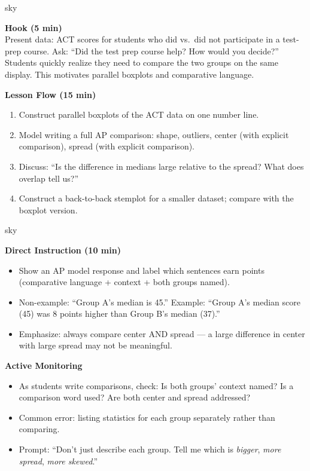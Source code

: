 \documentclass[10pt]{article}
\begin{document}
\begin{skillbox}{sky}
\begin{minipage}[t]{0.48\linewidth}
    \textbf{Hook (5 min)}\\
    Present data: ACT scores for students who did vs.\ did not participate in a test-prep course. Ask: ``Did the test prep course help? How would you decide?'' Students quickly realize they need to compare the two groups on the same display. This motivates parallel boxplots and comparative language.
\end{minipage}
\hfill
\begin{minipage}[t]{0.48\linewidth}
    \textbf{Lesson Flow (15 min)}
    \begin{enumerate}
        \item Construct parallel boxplots of the ACT data on one number line.
        \item Model writing a full AP comparison: shape, outliers, center (with explicit comparison), spread (with explicit comparison).
        \item Discuss: ``Is the difference in medians large relative to the spread? What does overlap tell us?''
        \item Construct a back-to-back stemplot for a smaller dataset; compare with the boxplot version.
    \end{enumerate}
\end{minipage}
\end{skillbox}

\begin{skillbox}{sky}
\begin{minipage}[t]{0.48\linewidth}
    \textbf{Direct Instruction (10 min)}
    \begin{itemize}
        \item Show an AP model response and label which sentences earn points (comparative language + context + both groups named).
        \item Non-example: ``Group A's median is 45.'' Example: ``Group A's median score (45) was 8 points higher than Group B's median (37).''
        \item Emphasize: always compare center AND spread --- a large difference in center with large spread may not be meaningful.
    \end{itemize}
\end{minipage}
\hfill
\begin{minipage}[t]{0.48\linewidth}
    \textbf{Active Monitoring}
    \begin{itemize}
        \item As students write comparisons, check: Is both groups' context named? Is a comparison word used? Are both center and spread addressed?
        \item Common error: listing statistics for each group separately rather than comparing.
        \item Prompt: ``Don't just describe each group. Tell me which is \textit{bigger}, \textit{more spread}, \textit{more skewed}.''
    \end{itemize}
\end{minipage}
\end{skillbox}
\end{document}
